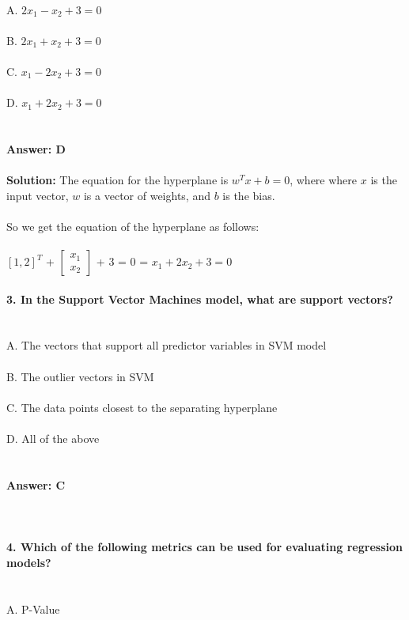 \documentclass[prl,twocolumn,showpacs,preprintnumbers,superscriptaddress]{revtex4}
\theoremstyle{plain}
\theoremstyle{definition}
\begin{document}
\begin{widetext}
\\
\noindent A. $2x_{1} - x_{2} + 3 = 0$
\\
\\
B. $2x_{1} + x_{2} + 3 = 0$
\\
\\
C. $x_{1} - 2x_{2} + 3 = 0$\
\\
\\
D. $x_{1} + 2x_{2} + 3 = 0$
\\
\\
\\
\textbf{Answer: D}
\\
\\
\textbf{Solution:} The equation for the hyperplane is $w^T x + b = 0$, where where $x$ is the input vector, $w$ is a vector of weights, and $b$ is the bias.
\\
\\
So we get the equation of the hyperplane as follows:
\\
\\
$[1,2]^T$ + $\begin{bmatrix}   {x_{1}}  \\ {x_{2}}\end{bmatrix}$ + 3 = 0 = $x_{1} + 2x_{2} + 3 = 0$
\\
\\
\textbf{3. In the Support Vector Machines model, what are support vectors?}
\\
\\
\\
\noindent A. The vectors that support all predictor variables in SVM model
\\
\\
B. The outlier vectors in SVM
\\
\\
C. The data points closest to the separating hyperplane
\\
\\
D. All  of the above
\\
\\
\\
\textbf{Answer: C}
\\
\\
\\
\\
\textbf{4. Which of the following metrics can be used for evaluating regression models?}
\\
\\
\\
\noindent A. P-Value
\\
\\

\end{widetext}
\end{document}
